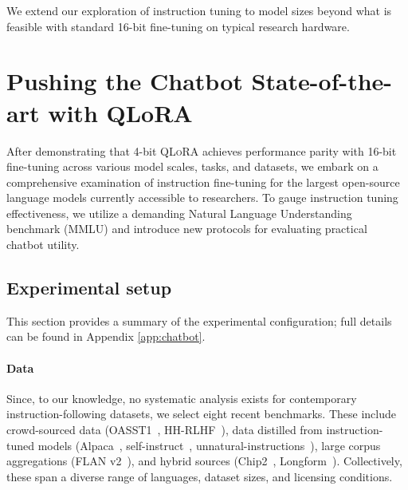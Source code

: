 We extend our exploration of instruction tuning to model sizes beyond what is feasible with standard 16-bit fine-tuning on typical research hardware.

\section{Pushing the Chatbot State-of-the-art with QLoRA}
\label{sec:pushing}
After demonstrating that 4-bit \textsc{QLoRA} achieves performance parity with 16-bit fine-tuning across various model scales, tasks, and datasets, we embark on a comprehensive examination of instruction fine-tuning for the largest open-source language models currently accessible to researchers. To gauge instruction tuning effectiveness, we utilize a demanding Natural Language Understanding benchmark (MMLU) and introduce new protocols for evaluating practical chatbot utility.

\subsection{Experimental setup} This section provides a summary of the experimental configuration; full details can be found in Appendix \ref{app:chatbot}.

\paragraph{Data} Since, to our knowledge, no systematic analysis exists for contemporary instruction-following datasets, we select eight recent benchmarks. These include crowd-sourced data (OASST1~\citep{kopf2023openassistant}, HH-RLHF~\citep{bai2022training}), data distilled from instruction-tuned models (Alpaca~\citep{alpaca}, self-instruct~\citep{wang2022self}, unnatural-instructions~\citep{honovich2022unnatural}), large corpus aggregations (FLAN v2~\citep{chung2022scaling}), and hybrid sources (Chip2~\citep{laion2023}, Longform~\citep{koksal2023longform}). Collectively, these span a diverse range of languages, dataset sizes, and licensing conditions.

